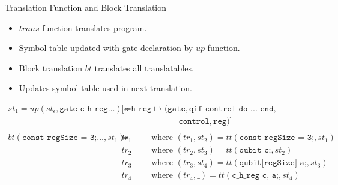 \begin{frame}{Translation Function and Block Translation}
    \begin{itemize}
        \item $trans$ function translates program.
        \item Symbol table updated with gate declaration by $up$ function.
        \item Block translation $bt$ translates all translatables.
        \item Updates symbol table used in next translation.
    \end{itemize}
    \Large
    \begin{align*}
        st_1 = up(st_\epsilon, \texttt{gate c\_h\_reg} \dots) =& \ 
        [ \texttt{c\_h\_reg} \mapsto (\texttt{gate}, \texttt{qif control do ... end}, \\
        & \quad\quad\quad\quad\quad\quad\quad \texttt{control}, \texttt{reg})  ]\\
        &\\
        bt(\texttt{const regSize = 3;} \dots, st_1) =& \ tr_1 \quad \quad \text{ where } (tr_1, st_2) = tt(\texttt{const regSize = 3;}, st_1)\\ 
                                                & \ tr_2 \quad \quad \text{ where } (tr_2, st_3) = tt(\texttt{qubit c;}, st_2)\\ 
                                                & \ tr_3 \quad \quad \text{ where } (tr_3, st_4) = tt(\texttt{qubit[regSize] a;}, st_3)\\ 
                                                & \ tr_4 \quad \quad \text{ where } (tr_4, \_) = tt(\texttt{c\_h\_reg c, a;}, st_4)
    \end{align*}
\end{frame}

